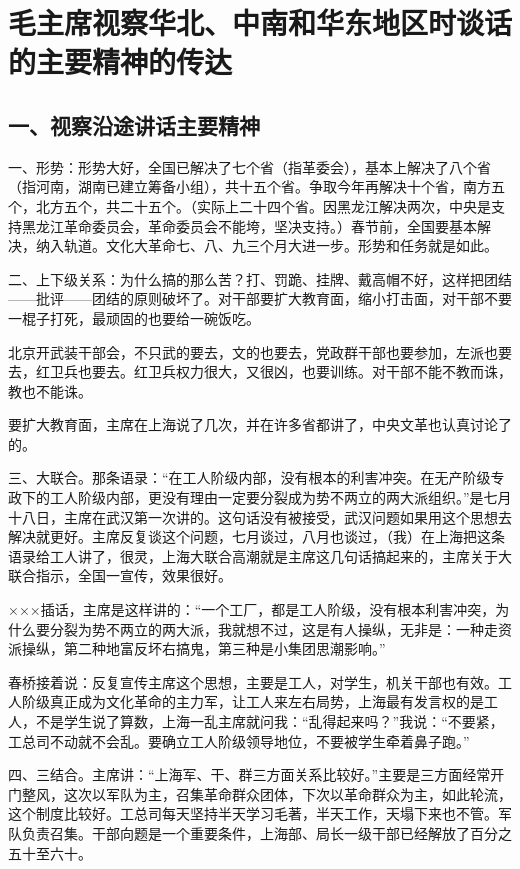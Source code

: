\section[毛主席视察华北、中南和华东地区时谈话的主要精神的传达]{毛主席视察华北、中南和华东地区时谈话的主要精神的传达}
\subsection{一、视察沿途讲话主要精神}

一、形势：形势大好，全国已解决了七个省（指革委会），基本上解决了八个省（指河南，湖南已建立筹备小组），共十五个省。争取今年再解决十个省，南方五个，北方五个，共二十五个。（实际上二十四个省。因黑龙江解决两次，中央是支持黑龙江革命委员会，革命委员会不能垮，坚决支持。）春节前，全国要基本解决，纳入轨道。文化大革命七、八、九三个月大进一步。形势和任务就是如此。

二、上下级关系：为什么搞的那么苦？打、罚跪、挂牌、戴高帽不好，这样把团结——批评——团结的原则破坏了。对干部要扩大教育面，缩小打击面，对干部不要一棍子打死，最顽固的也要给一碗饭吃。

北京开武装干部会，不只武的要去，文的也要去，党政群干部也要参加，左派也要去，红卫兵也要去。红卫兵权力很大，又很凶，也要训练。对干部不能不教而诛，教也不能诛。

要扩大教育面，主席在上海说了几次，并在许多省都讲了，中央文革也认真讨论了的。

三、大联合。那条语录：“在工人阶级内部，没有根本的利害冲突。在无产阶级专政下的工人阶级内部，更没有理由一定要分裂成为势不两立的两大派组织。”是七月十八日，主席在武汉第一次讲的。这句话没有被接受，武汉问题如果用这个思想去解决就更好。主席反复谈这个问题，七月谈过，八月也谈过，（我）在上海把这条语录给工人讲了，很灵，上海大联合高潮就是主席这几句话搞起来的，主席关于大联合指示，全国一宣传，效果很好。

×××插话，主席是这样讲的：“一个工厂，都是工人阶级，没有根本利害冲突，为什么要分裂为势不两立的两大派，我就想不过，这是有人操纵，无非是：一种走资派操纵，第二种地富反坏右搞鬼，第三种是小集团思潮影响。”

春桥接着说：反复宣传主席这个思想，主要是工人，对学生，机关干部也有效。工人阶级真正成为文化革命的主力军，让工人来左右局势，上海最有发言权的是工人，不是学生说了算数，上海一乱主席就问我：“乱得起来吗？”我说：“不要紧，工总司不动就不会乱。要确立工人阶级领导地位，不要被学生牵着鼻子跑。”

四、三结合。主席讲：“上海军、干、群三方面关系比较好。”主要是三方面经常开门整风，这次以军队为主，召集革命群众团体，下次以革命群众为主，如此轮流，这个制度比较好。工总司每天坚持半天学习毛著，半天工作，天塌下来也不管。军队负责召集。干部向题是一个重要条件，上海部、局长一级干部已经解放了百分之五十至六十。

